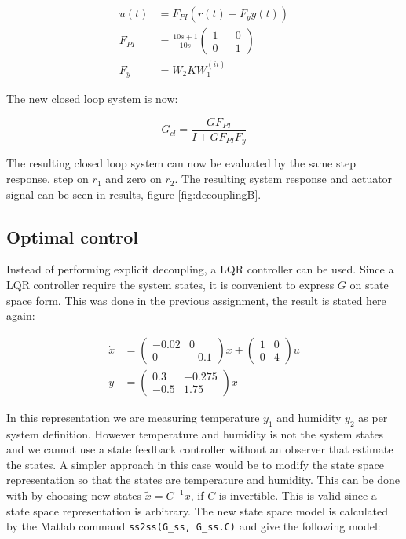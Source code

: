 \documentclass[a4paper, titlepage]{article}
\begin{document}
\begin{equation}
\begin{split}
u(t) &= F_{PI}(r(t) - F_yy(t)) \\
F_{PI} &= \frac{10s+1}{10s}
\begin{pmatrix}
1 && 0 \\ 0 && 1
\end{pmatrix} \\
F_y &= W_2KW^{(ii)}_1
\end{split}
\end{equation}

The new closed loop system is now:

\begin{equation}
G_{cl} = \frac{GF_{PI}}{I+GF_{PI}F_y}
\end{equation}

The resulting closed loop system can now be evaluated by the same step response, step on $r_1$ and zero on $r_2$.
The resulting system response and actuator signal can be seen in results, figure \ref{fig:decouplingB}.

\subsection{Optimal control}
Instead of performing explicit decoupling, a LQR controller can be used.
Since a LQR controller require the system states, it is convenient to express $G$ on state space form.
This was done in the previous assignment, the result is stated here again:

\begin{equation}
\begin{split}
\dot{x} &= 
\begin{pmatrix}
-0.02 & 0 \\ 0 & -0.1
\end{pmatrix}x
+
\begin{pmatrix}
1 & 0 \\ 0 & 4
\end{pmatrix}u \\
y &= 
\begin{pmatrix}
0.3 & -0.275 \\ -0.5 & 1.75
\end{pmatrix}x
\end{split}
\label{equ:oldSS}
\end{equation}

In this representation we are measuring temperature $y_1$ and humidity $y_2$ as per system definition.
However temperature and humidity is not the system states and we cannot use a state feedback controller without an observer that estimate the states.
A simpler approach in this case would be to modify the state space representation so that the states are temperature and humidity.
This can be done with by choosing new states $\tilde{x} = C^{-1}x$, if $C$ is invertible.
This is valid since a state space representation is arbitrary.
The new state space model is calculated by the Matlab command \verb|ss2ss(G_ss, G_ss.C)| and give the following model:
\end{document}
